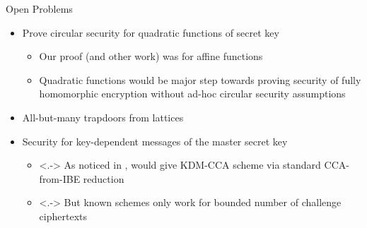 \documentclass{beamer}%
\begin{document}
\begin{frame}{Open Problems}
  \begin{itemize}
  \item<+-> Prove circular security for quadratic functions of secret key
    \begin{itemize}
    \item<+-> Our proof (and other work) was for affine functions \smallskip
    \item<+-> Quadratic functions would be major step towards proving
      security of fully homomorphic encryption without ad-hoc circular
      security assumptions
    \end{itemize}
  \item<+-> All-but-\alert{many} trapdoors  from lattices
    \item<+-> Security for key-dependent messages of the master secret
    key
    \begin{itemize}
    \item<.-> As noticed in , would give KDM-CCA
      scheme via standard CCA-from-IBE reduction 
    \item<.-> But known schemes only work for bounded number of
      challenge ciphertexts
    \end{itemize}
  \end{itemize}

  \medskip
\end{frame}
\end{document}
